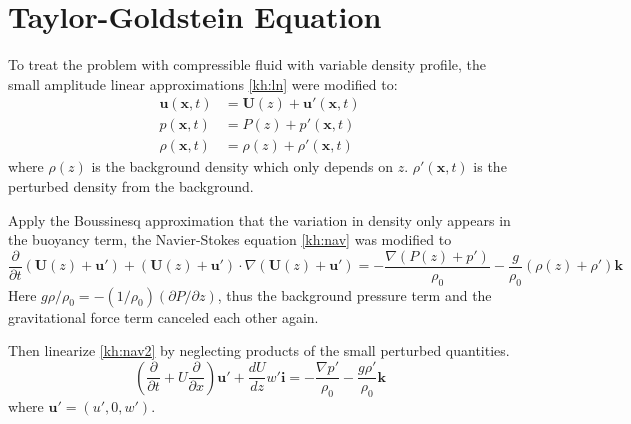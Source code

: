 \section{Taylor-Goldstein Equation}
To treat the problem with compressible fluid with variable density
profile, the small amplitude linear approximations \eqref{kh:ln}
were modified to:
\begin{subequations}\label{kh:st}
\begin{align}
    \mathbf{u}(\mathbf{x},t)&=\mathbf{U}(z)+\mathbf{u}'(\mathbf{x},t)\label{kn:stu}\\
    p(\mathbf{x},t)&=P(z)+p'(\mathbf{x},t)\label{kn:stp}\\
    \rho(\mathbf{x},t)&=\rho(z)+\rho'(\mathbf{x},t)\label{kn:strho}
\end{align}
\end{subequations}
where $\rho(z)$ is the background density which only depends on $z$.
$\rho'(\mathbf{x},t)$ is the perturbed density from the background.

Apply the Boussinesq approximation that the variation in density
only appears in the buoyancy term, the Navier-Stokes equation
\eqref{kh:nav} was modified to
\begin{equation}\label{kh:nav2}
\frac{\partial}{\partial
t}(\mathbf{U}(z)+\mathbf{u}')+(\mathbf{U}(z)+\mathbf{u}')
\cdot\nabla(\mathbf{U}(z)+\mathbf{u}')=-\frac{\nabla(P(z)+p')}{\rho_0}
-\frac{g}{\rho_0}(\rho(z)+\rho')\mathbf{k}
\end{equation}
Here $g\rho/\rho_0=-(1/\rho_0)(\partial P/\partial z)$, thus the
background pressure term and the gravitational force term canceled
each other again.

Then linearize \eqref{kh:nav2} by neglecting products of the small
perturbed quantities.
\begin{equation}\label{kh:str}
(\frac{\partial}{\partial t}+U\frac{\partial}{\partial
x})\mathbf{u}'+\frac{dU}{dz}w'\mathbf{i}=-\frac{\nabla
p'}{\rho_0}-\frac{g\rho'}{\rho_0}\mathbf{k}
\end{equation}
where $\mathbf{u}' = (u',0,w')$.

